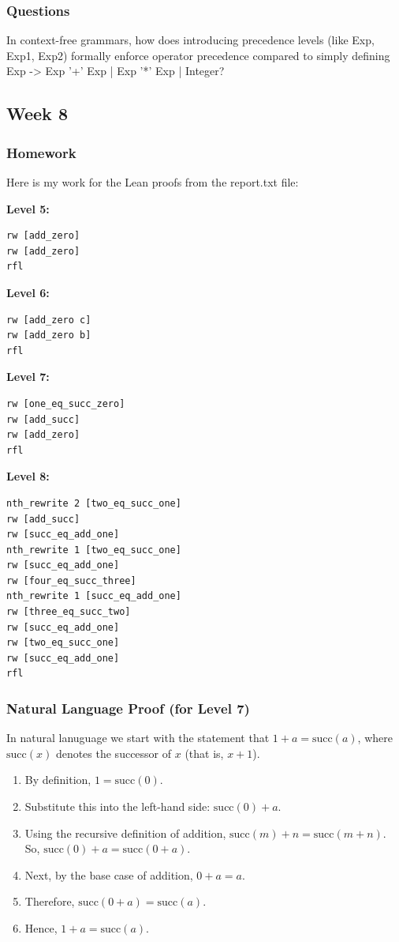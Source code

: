 \documentclass{article}
\theoremstyle{theorem}
\theoremstyle{definition}
\theoremstyle{remark}
\begin{document}
\subsubsection{Questions}
In context-free grammars, how does introducing precedence levels (like Exp, Exp1, Exp2) formally enforce operator precedence compared to simply defining Exp -> Exp '+' Exp | Exp '*' Exp | Integer?

\subsection{Week 8}

\subsubsection{Homework}

Here is my work for the Lean proofs from the report.txt file:

\textbf{Level 5:}
\begin{lstlisting}
rw [add_zero]
rw [add_zero]
rfl
\end{lstlisting}

\textbf{Level 6:}
\begin{lstlisting}
rw [add_zero c]
rw [add_zero b]
rfl
\end{lstlisting}

\textbf{Level 7:}
\begin{lstlisting}
rw [one_eq_succ_zero]
rw [add_succ]
rw [add_zero]
rfl
\end{lstlisting}

\textbf{Level 8:}
\begin{lstlisting}
nth_rewrite 2 [two_eq_succ_one]
rw [add_succ]
rw [succ_eq_add_one]
nth_rewrite 1 [two_eq_succ_one]
rw [succ_eq_add_one]
rw [four_eq_succ_three]
nth_rewrite 1 [succ_eq_add_one]
rw [three_eq_succ_two]
rw [succ_eq_add_one]
rw [two_eq_succ_one]
rw [succ_eq_add_one]
rfl
\end{lstlisting}

\subsubsection{Natural Language Proof (for Level 7)}
In natural lanuguage we start with the statement that \(1 + a = \text{succ}(a)\), where \(\text{succ}(x)\) denotes the successor of \(x\) (that is, \(x + 1\)).

\begin{enumerate}
    \item By definition, \(1 = \text{succ}(0)\).
    \item Substitute this into the left-hand side: \(\text{succ}(0) + a\).
    \item Using the recursive definition of addition, \(\text{succ}(m) + n = \text{succ}(m + n)\).  
          So, \(\text{succ}(0) + a = \text{succ}(0 + a)\).
    \item Next, by the base case of addition, \(0 + a = a\).
    \item Therefore, \(\text{succ}(0 + a) = \text{succ}(a)\).
    \item Hence, \(1 + a = \text{succ}(a)\).
\end{enumerate}
\end{document}
